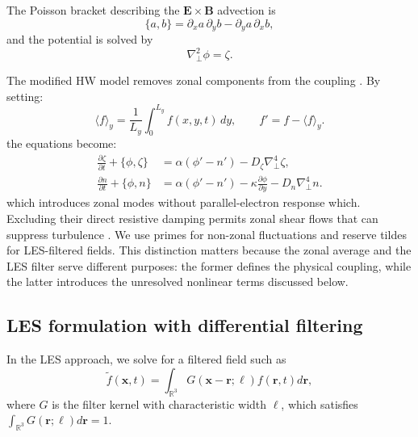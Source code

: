 \documentclass[authoryear,preprint,review,12pt]{elsarticle}
\begin{document}
The Poisson bracket describing the $\mathbf{E}\times\mathbf{B}$ advection is
\begin{equation}
    \{a,b\}=\partial_xa\,\partial_yb-\partial_ya\,\partial_xb,
    \label{eq:hw_poisson}
\end{equation}
and the potential is solved by
\begin{equation}
    \nabla_\perp^2\phi=\zeta.
\end{equation}

The modified HW model removes zonal components from the coupling \citep{numata_bifurcation_2007}.
By setting:
\begin{equation}
    \langle f\rangle_y=\frac{1}{L_y}\int_0^{L_y}f(x,y,t)\,dy,
    \qquad f'=f-\langle f\rangle_y.
    \label{eq:zonal_decomposition}
\end{equation}
the equations become:
\begin{align}
    \frac{\partial\zeta}{\partial t}+\{\phi,\zeta\}
    &=\alpha(\phi'-n')-D_\zeta\nabla_\perp^4\zeta,
    \label{eq:mhw_vorticity}\\
    \frac{\partial n}{\partial t}+\{\phi,n\}
    &=\alpha(\phi'-n')-\kappa\frac{\partial\phi}{\partial y}
      -D_n\nabla_\perp^4 n.
    \label{eq:mhw_density}
\end{align}
which introduces zonal modes without parallel-electron response which. Excluding their direct resistive damping permits zonal shear flows that can suppress turbulence \citep{numata_bifurcation_2007}. We use primes for non-zonal fluctuations and reserve tildes for LES-filtered fields. This distinction matters because the zonal average and the LES filter serve different purposes: the former defines the physical coupling, while the latter introduces the unresolved nonlinear terms discussed below.

\subsection{LES formulation with differential filtering}
\label{sec:GermanoDifferentialFilter}

In the LES approach, we solve for a filtered field such as
\begin{equation}
    \widetilde{f}(\boldsymbol{x},t) 
    = 
    \int_{\mathbb{R}^3} G(\boldsymbol{x}-\boldsymbol{r}; \ell) f (\boldsymbol{r}, t) d\boldsymbol{r},
\end{equation}
where $G$ is the filter kernel with characteristic width $\ell$, which satisfies $\int_{\mathbb{R}^3} G(\mathbf{r};\ell)d\mathbf{{r}}=1$.
\end{document}
